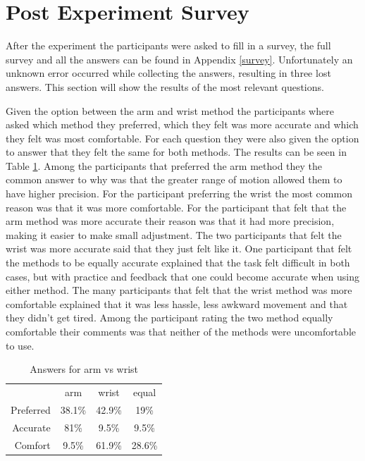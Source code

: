 \section{Post Experiment Survey}
After the experiment the participants were asked to fill in a survey, the full survey and all the answers can be found in Appendix \ref{survey}. Unfortunately an unknown error occurred while collecting the answers, resulting in three lost answers. This section will show the results of the most relevant questions.

Given the option between the arm and wrist method the participants where asked which method they preferred, which they felt was more accurate and which they felt was most comfortable. For each question they were also given the option to answer that they felt the same for both methods. The results can be seen in Table \ref{arm_vs_wrist}. Among the participants that preferred the arm method they the common answer to why was that the greater range of motion allowed them to have higher precision. For the participant preferring the wrist the most common reason was that it was more comfortable. For the participant that felt that the arm method was more accurate their reason was that it had more precision, making it easier to make small adjustment. The two participants that felt the wrist was more accurate said that they just felt like it. One participant that felt the methods to be equally accurate explained that the task felt difficult in both cases, but with practice and feedback that one could become accurate when using either method. The many participants that felt that the wrist method was more comfortable explained that it was less hassle, less awkward movement and that they didn't get tired. Among the participant rating the two method equally comfortable their comments was that neither of the methods were uncomfortable to use. 


\begin{table}[]
\centering
\begin{tabular}{rccc}
\multicolumn{1}{c}{} & arm & wrist & equal \\ \cline{2-4} 
\multicolumn{1}{r|}{Preferred} & \multicolumn{1}{c|}{38.1\%} & \multicolumn{1}{c|}{42.9\%} & \multicolumn{1}{c|}{19\%} \\ \cline{2-4} 
\multicolumn{1}{r|}{Accurate} & \multicolumn{1}{c|}{81\%} & \multicolumn{1}{c|}{9.5\%} & \multicolumn{1}{c|}{9.5\%} \\ \cline{2-4} 
\multicolumn{1}{r|}{Comfort} & \multicolumn{1}{c|}{9.5\%} & \multicolumn{1}{c|}{61.9\%} & \multicolumn{1}{c|}{28.6\%} \\ \cline{2-4} 
\end{tabular}
\caption{Answers for arm vs wrist}
\label{arm_vs_wrist}
\end{table}


